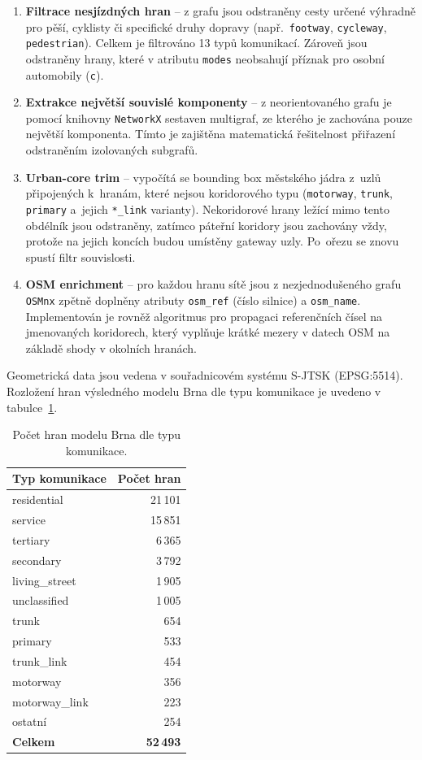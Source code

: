 \begin{enumerate}
  \item \textbf{Filtrace nesjízdných hran} -- z grafu jsou odstraněny cesty určené výhradně pro pěší, cyklisty či specifické druhy dopravy (např.\ \texttt{footway}, \texttt{cycleway}, \texttt{pedestrian}). Celkem je filtrováno 13 typů komunikací. Zároveň jsou odstraněny hrany, které v atributu \texttt{modes} neobsahují příznak pro osobní automobily (\texttt{c}).
  \item \textbf{Extrakce největší souvislé komponenty} -- z neorientovaného grafu je pomocí knihovny \texttt{NetworkX} sestaven multigraf, ze kterého je zachována pouze největší komponenta. Tímto je zajištěna matematická řešitelnost přiřazení odstraněním izolovaných subgrafů.
  \item \textbf{Urban-core trim} -- vypočítá se bounding box městského jádra z~uzlů připojených k~hranám, které nejsou koridorového typu (\texttt{motorway}, \texttt{trunk}, \texttt{primary} a~jejich \texttt{*\_link} varianty). Nekoridorové hrany ležící mimo tento obdélník jsou odstraněny, zatímco páteřní koridory jsou zachovány vždy, protože na jejich koncích budou umístěny gateway uzly. Po~ořezu se znovu spustí filtr souvislosti.
  \item \textbf{OSM enrichment} -- pro každou hranu sítě jsou z nezjednodušeného grafu \texttt{OSMnx} zpětně doplněny atributy \texttt{osm\_ref} (číslo silnice) a \texttt{osm\_name}. Implementován je rovněž algoritmus pro propagaci referenčních čísel na jmenovaných koridorech, který vyplňuje krátké mezery v datech OSM na základě shody v okolních hranách.
\end{enumerate}

Geometrická data jsou vedena v souřadnicovém systému S-JTSK (EPSG:5514). Rozložení hran výsledného modelu Brna dle typu komunikace je uvedeno v tabulce~\ref{tab:link-types}.

\begin{table}[ht]
\centering
\label{tab:link-types}
\begin{tabular}{lr}
\toprule
\textbf{Typ komunikace} & \textbf{Počet hran} \\
\midrule
residential    & 21\,101 \\
service        & 15\,851 \\
tertiary       & 6\,365  \\
secondary      & 3\,792  \\
living\_street & 1\,905  \\
unclassified   & 1\,005  \\
trunk          & 654     \\
primary        & 533     \\
trunk\_link    & 454     \\
motorway       & 356     \\
motorway\_link & 223     \\
ostatní        & 254     \\
\midrule
\textbf{Celkem} & \textbf{52\,493} \\
\bottomrule
\end{tabular}
\caption{Počet hran modelu Brna dle typu komunikace.}
\end{table}

